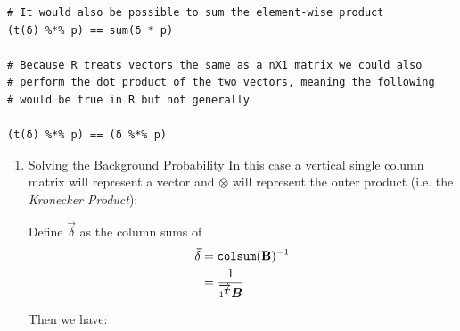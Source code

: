 \documentclass[11pt]{article}
\begin{document}
\begin{enumerate}
\begin{lstlisting}
# It would also be possible to sum the element-wise product
(t(δ) %*% p) == sum(δ * p)

# Because R treats vectors the same as a nX1 matrix we could also
# perform the dot product of the two vectors, meaning the following
# would be true in R but not generally

(t(δ) %*% p) == (δ %*% p)
\end{lstlisting}


\begin{enumerate}
\item Solving the Background Probability
\label{sec:orgc882834}
In this case a vertical single column matrix will represent a vector and \(\otimes\) will represent the outer product (i.e. the \emph{Kronecker Product}):



Define \(\vec{\delta}\) as the column sums of
\[\begin{aligned}
     \vec{\delta} & = \mathtt{colsum} (\text{{\bfseries{B}}})^{- 1}\\
     & = \frac{1}{\overrightarrow{1^{{\scriptsize \ensuremath{\boldsymbol{T}}}}}
     \ensuremath{\boldsymbol{B}}}
   \end{aligned}\]


Then we have:



\end{enumerate}
\end{enumerate}
\end{document}
